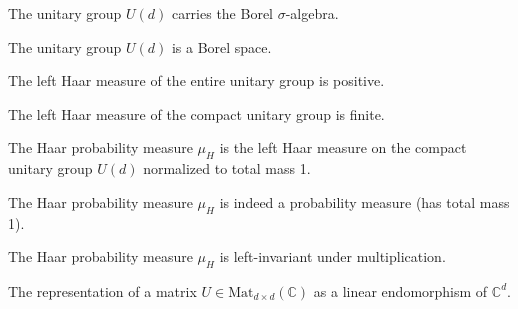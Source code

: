 \begin{theorem}\label{thm:instMeasurableSpaceUnitaryGroup}
  \leanok
  The unitary group $U(d)$ carries the Borel $\sigma$-algebra.
\end{theorem}

\begin{theorem}\label{thm:instBorelSpaceUnitaryGroup}
  \leanok
  The unitary group $U(d)$ is a Borel space.
\end{theorem}

\begin{theorem}\label{thm:haar_univ_ne_zero}
  \leanok
  The left Haar measure of the entire unitary group is positive.
\end{theorem}

\begin{theorem}\label{thm:haar_univ_ne_top}
  \leanok
  The left Haar measure of the compact unitary group is finite.
\end{theorem}

\begin{definition}\label{def:haarProb}
  \leanok
  The Haar probability measure $\mu_H$ is the left Haar measure on the compact unitary group $U(d)$ normalized to total mass 1.
\end{definition}

\begin{theorem}\label{thm:instIsProbabilityMeasureHaarProb}
  \leanok
  The Haar probability measure $\mu_H$ is indeed a probability measure (has total mass 1).
\end{theorem}

\begin{theorem}\label{thm:instIsMulLeftInvariantHaarProb}
  \leanok
  The Haar probability measure $\mu_H$ is left-invariant under multiplication.
\end{theorem}

\begin{definition}\label{def:endOf}
  \leanok
  The representation of a matrix $U \in \text{Mat}_{d \times d}(\mathbb{C})$ as a linear endomorphism of $\mathbb{C}^d$.
\end{definition}

